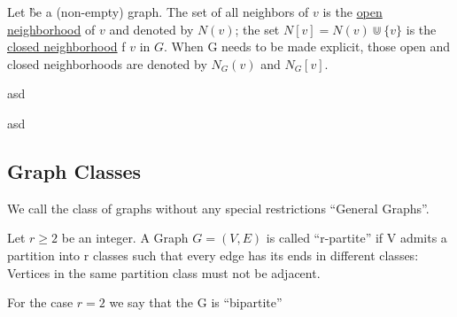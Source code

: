 \begin{definition}
    Let \G be a (non-empty) graph. 
    The set of all neighbors of $v$ is the \underline{open neighborhood} of $v$ and denoted by $N(v)$; the set $N[v] = N(v) \Cup \{v\}$ is the \underline{closed neighborhood} f $v$ in $G$. When G needs to be made explicit, those open and closed neighborhoods are denoted by $N_G(v)$ and $N_G[v]$. 
\end{definition}

\begin{definition}
    asd
\end{definition}

\begin{definition}
    asd
\end{definition}

\subsection*{Graph Classes}

We call the class of graphs without any special restrictions ``General Graphs''.

\begin{definition}
    Let $r \geq 2$ be an integer. A Graph $G = (V,E)$ is called ``r-partite'' if V admits a partition into r classes such that every edge has its ends in different classes: Vertices in the same partition class must not be adjacent. 
    
    For the case $r = 2$ we say that the G is ``bipartite'' 
    
\end{definition}

\begin{definition}
    
\end{definition}

\begin{definition}
    
\end{definition}

\begin{definition}
    
\end{definition}

